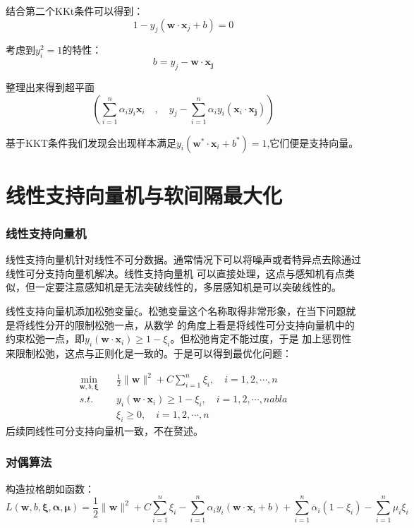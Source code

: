 \documentclass{article}
\begin{document}
        结合第二个KKt条件可以得到：
        \[1-y_j(\boldsymbol{w}\cdot \boldsymbol{x}_j+b)=0\]

        考虑到$y_i^2=1$的特性：
        \[b=y_j-\boldsymbol{w}\cdot\boldsymbol{x_j}\]

        整理出来得到超平面
        \[(\sum_{i=1}^{n}\alpha_iy_i\boldsymbol{x}_i \quad,\quad y_j-\sum_{i=1}^{n}\alpha_iy_i(\boldsymbol{x}_i\cdot\boldsymbol{x_j}))\]

        基于KKT条件我们发现会出现样本满足$y_i(\boldsymbol{w}^*\cdot \boldsymbol{x}_i+b^*)=1$,它们便是支持向量。

\part{线性支持向量机与软间隔最大化}
    \setcounter{section}{0}
    \section{线性支持向量机}
        线性支持向量机针对线性不可分数据。通常情况下可以将噪声或者特异点去除通过线性可分支持向量机解决。线性支持向量机
        可以直接处理，这点与感知机有点类似，但一定要注意感知机是无法突破线性的，多层感知机是可以突破线性的。

        线性支持向量机添加松弛变量$\xi$。松弛变量这个名称取得非常形象，在当下问题就是将线性分开的限制松弛一点，从数学
        的角度上看是将线性可分支持向量机中的约束松弛一点，即$y_i(\boldsymbol{w}\cdot\boldsymbol{x}_i)\ge 1-\xi_i$。但松弛肯定不能过度，于是
        加上惩罚性来限制松弛，这点与正则化是一致的。于是可以得到最优化问题：
        
        \begin{align*}
            \min_{\boldsymbol{w},b,\boldsymbol{\xi}} \quad & \frac{1}{2}\|\boldsymbol{w}\|^2+C\sum_{i=1}^{n}\xi_i,\quad i=1,2,\cdots,n\\
            s.t. \quad & y_i(\boldsymbol{w}\cdot\boldsymbol{x}_i)\ge 1-\xi_i,\quad i=1,2,\cdots,nabla\\
                    &   \xi_i \ge 0,\quad i=1,2,\cdots,n
        \end{align*}
        后续同线性可分支持向量机一致，不在赘述。

    \section{对偶算法}
    构造拉格朗如函数：
    \[L(\boldsymbol{w},b,\boldsymbol{\xi},\boldsymbol{\alpha},\boldsymbol{\mu })=\frac{1}{2}\|\boldsymbol{w}\|^2+C\sum_{i=1}^{n}\xi_i-\sum_{i=1}^{n}\alpha_iy_i(\boldsymbol{w}\cdot\boldsymbol{x}_i+b)+\sum_{i=1}^{n}\alpha_i(1-\xi_i)-\sum_{i=1}^{n}\mu_i\xi_i\]
\end{document}
